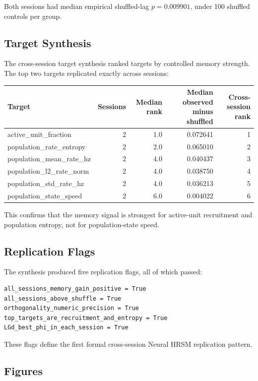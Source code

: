 Both sessions had median empirical shuffled-lag \(p = 0.009901\), under 100 shuffled controls per group.

\subsection{Target Synthesis}

The cross-session target synthesis ranked targets by controlled memory strength. The top two targets replicated exactly across sessions:

\begin{center}
\begin{tabular}{lrrrr}
\hline
Target & Sessions & Median rank & Median observed minus shuffled & Cross-session rank \\
\hline
active\_unit\_fraction & 2 & 1.0 & 0.072641 & 1 \\
population\_rate\_entropy & 2 & 2.0 & 0.065010 & 2 \\
population\_mean\_rate\_hz & 2 & 4.0 & 0.040437 & 3 \\
population\_l2\_rate\_norm & 2 & 4.0 & 0.038750 & 4 \\
population\_std\_rate\_hz & 2 & 4.0 & 0.036213 & 5 \\
population\_state\_speed & 2 & 6.0 & 0.004022 & 6 \\
\hline
\end{tabular}
\end{center}

This confirms that the memory signal is strongest for active-unit recruitment and population entropy, not for population-state speed.

\subsection{Replication Flags}

The synthesis produced five replication flags, all of which passed:

\begin{verbatim}
all_sessions_memory_gain_positive = True
all_sessions_above_shuffle = True
orthogonality_numeric_precision = True
top_targets_are_recruitment_and_entropy = True
LGd_best_phi_in_each_session = True
\end{verbatim}

These flags define the first formal cross-session Neural HRSM replication pattern.

\subsection{Figures}

